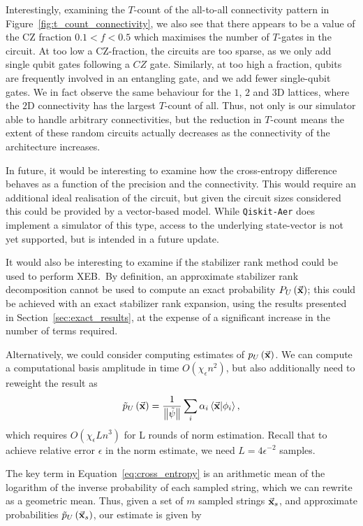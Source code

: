 Interestingly, examining the $T$-count of the all-to-all connectivity pattern in Figure~\ref{fig:t_count_connectivity}, we also see that there appears to be a value of the CZ fraction $0.1<f<0.5$ which maximises the number of $T$-gates in the circuit. At too low a CZ-fraction, the circuits are too sparse, as we only add single qubit gates following a $CZ$ gate. Similarly, at too high a fraction, qubits are frequently involved in an entangling gate, and we add fewer single-qubit gates. We in fact observe the same behaviour for the $1$, $2$ and $3$D lattices, where the $2$D connectivity has the largest $T$-count of all. Thus, not only is our simulator able to handle arbitrary connectivities, but the reduction in $T$-count means the extent of these random circuits actually decreases as the connectivity of the architecture increases.\par
In future, it would be interesting to examine how the cross-entropy difference behaves as a function of the precision and the connectivity. This would require an additional ideal realisation of the circuit, but given the circuit sizes considered this could be provided by a vector-based model. While \texttt{Qiskit-Aer} does implement a simulator of this type, access to the underlying state-vector is not yet supported, but is intended in a future update.\par
It would also be interesting to examine if the stabilizer rank method could be used to perform XEB.\ By definition, an approximate stabilizer rank decomposition cannot be used to compute an exact probability $P_{U}\left(\va{x}\right)$; this could be achieved with an exact stabilizer rank expansion, using the results presented in Section~\ref{sec:exact_results}, at the expense of a significant increase in the number of terms required.\par
Alternatively, we could consider computing estimates of $p_{U}\left(\va{x}\right)$. We can compute a computational basis amplitude in time $O\left(\chi_{\epsilon} n^{2}\right)$, but also additionally need to reweight the result as
\[\tilde{p}_{U}\left(\va{x}\right)=\frac{1}{\norm{\tilde{\psi}}}\sum_{i}\alpha_{i}\braket{\va{x}}{\phi_{i}},\]
which requires $O\left(\chi_{\epsilon}Ln^{3}\right)$ for L rounds of norm estimation. Recall that to achieve relative error $\epsilon$ in the norm estimate, we need $L=4\epsilon^{-2}$ samples.\par
The key term in Equation~\ref{eq:cross_entropy} is an arithmetic mean of the logarithm of the inverse probability of each sampled string, which we can rewrite as a geometric mean. Thus, given a set of $m$ sampled strings $\va{x}_{s}$, and approximate probabilities $\tilde{p}_{U}\left(\va{x}_{s}\right)$, our estimate is given by
